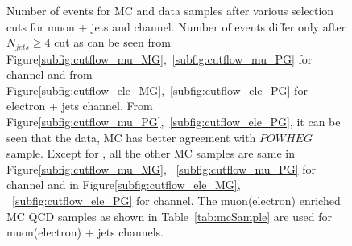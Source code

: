 \begin{figure}
    \vfil
    \caption{Number of events for MC and data samples after various selection cuts for muon +
    jets and \ejets channel. Number of events differ only after $N_{jets} \geq 4$ cut
    as can be seen from Figure\ref{subfig:cutflow_mu_MG},~\ref{subfig:cutflow_mu_PG} for \mujets
    channel and from Figure\ref{subfig:cutflow_ele_MG},~\ref{subfig:cutflow_ele_PG} for electron + 
    jets channel. From Figure\ref{subfig:cutflow_mu_PG},~\ref{subfig:cutflow_ele_PG}, it can be seen
    that the data, MC has better agreement with $POWHEG$ \ttjets sample. Except for 
    \ttjets, all the other MC samples are same in Figure\ref{subfig:cutflow_mu_MG},
    ~\ref{subfig:cutflow_mu_PG} for \mujets channel and in Figure\ref{subfig:cutflow_ele_MG},
    ~\ref{subfig:cutflow_ele_PG} for \ejets channel. The muon(electron) enriched MC QCD 
    samples as shown in Table~\ref{tab:mcSample} are used for muon(electron) + jets channels.}
    \label{fig:MGvsPG}
\end{figure}
